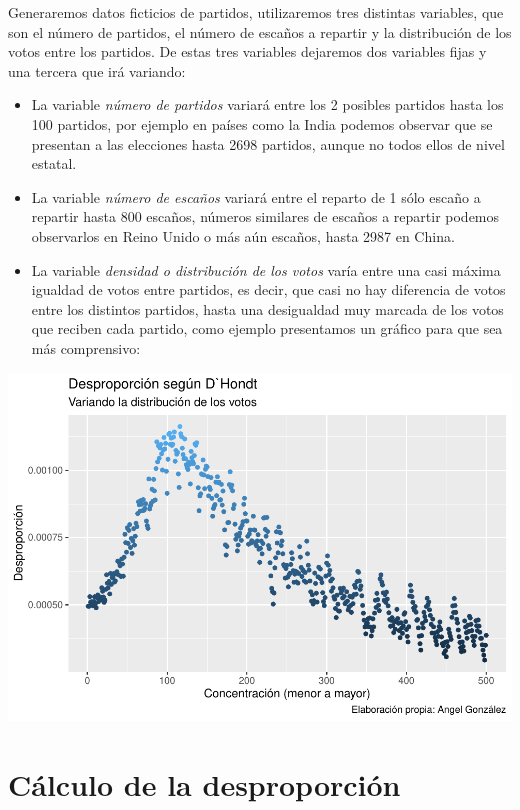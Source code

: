 \documentclass[12pt,a4paper,]{book}
\numberwithin{dummy}{section}
\theoremstyle{ocrenumbox}
\theoremstyle{blacknumex}
\theoremstyle{blacknumbox}
\theoremstyle{ocrenum}
\theoremstyle{ocrenum}
\begin{document}
Generaremos datos ficticios de partidos, utilizaremos tres distintas
variables, que son el número de partidos, el número de escaños a
repartir y la distribución de los votos entre los partidos. De estas
tres variables dejaremos dos variables fijas y una tercera que irá
variando:

\begin{itemize}
\item
  La variable \emph{número de partidos} variará entre los 2 posibles
  partidos hasta los 100 partidos, por ejemplo en países como la India
  podemos observar que se presentan a las elecciones hasta 2698
  partidos, aunque no todos ellos de nivel estatal.
\item
  La variable \emph{número de escaños} variará entre el reparto de 1
  sólo escaño a repartir hasta 800 escaños, números similares de escaños
  a repartir podemos observarlos en Reino Unido o más aún escaños, hasta
  2987 en China.
\item
  La variable \emph{densidad o distribución de los votos} varía entre
  una casi máxima igualdad de votos entre partidos, es decir, que casi
  no hay diferencia de votos entre los distintos partidos, hasta una
  desigualdad muy marcada de los votos que reciben cada partido, como
  ejemplo presentamos un gráfico para que sea más comprensivo:
\end{itemize}

\begin{center}\includegraphics[width=0.95\linewidth]{figurasR/unnamed-chunk-8-1} \end{center}

\hypertarget{cuxe1lculo-de-la-desproporciuxf3n}{%
\section{Cálculo de la
desproporción}\label{cuxe1lculo-de-la-desproporciuxf3n}}
\end{document}
